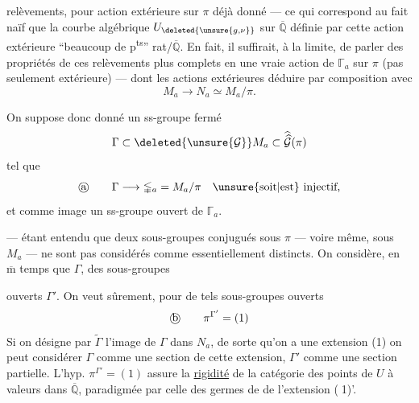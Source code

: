 
 relèvements, pour  action extérieure sur $\pi$ déjà donné --- ce qui correspond au fait naïf que la courbe algébrique $U_{\deleted{\unsure{g,\nu}}}$ sur $\overline{\mathbb Q}$ définie par cette action extérieure  ``beaucoup de p\textsuperscript{ts}'' rat/$\overline{\mathbb Q}$. En fait, il suffirait, à la limite, de parler des  propriétés de ces relèvements plus complets en une vraie action de  $\mathbb{\Gamma}_a$ sur $\pi$ (pas seulement extérieure) --- dont les actions extérieures   déduire par composition avec
\[
M_a \longrightarrow N_a \simeq M_a/\pi.
\]

 On suppose donc donné un ss-groupe fermé
\[
\Gamma \subset \deleted{\unsure{\mathcal G}} M_a \subset \widehat{\widehat{\mathcal G}}(\pi)
\]
tel que
\[
\text{\textcircled{a}}\qquad
\Gamma \longrightarrow \mathbb{\Gamma}_a
 = M_a/\pi
\quad \text{\unsure{soit|est} injectif,}
\]
et  comme image un ss-groupe ouvert de $\mathbb{\Gamma}_a$.

--- étant entendu que deux sous-groupes conjugués sous $\pi$ --- voire même,  sous $M_a$ --- ne sont pas considérés comme essentiellement distincts. On considère, en $\overline{\mathrm m}$ temps que $\Gamma$, des sous-groupes


ouverts $\Gamma'$. On veut sûrement, pour de tels sous-groupes ouverts
\[
\text{\textcircled{b}}\qquad \pi^{\Gamma'}=(1)
\]
Si on désigne par $\widetilde{\Gamma}$ l'image de $\Gamma$ dans $N_a$, de sorte qu'on a une extension
(1)\quad
{}
on peut considérer $\Gamma$ comme une section de cette extension, $\Gamma'$ comme une section partielle. L'hyp. $\pi^{\Gamma'}=(1)$ assure la \uline{rigidité} de la catégorie des points de $U$ à valeurs dans $\overline{\mathbb Q}$, paradigmée par celle des germes de  de l'extension \textcircled{(1)'}.

